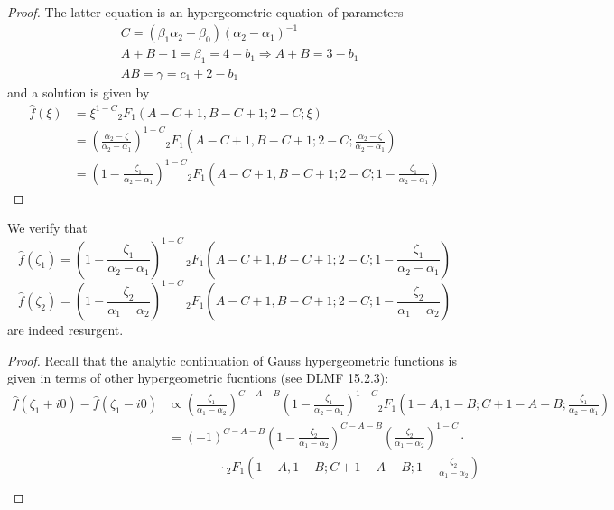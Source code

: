 \documentclass[11pt,a4paper,twoside,leqno,noamsfonts]{amsart}
\numberwithin{equation}{section}
\begin{document}
\begin{proof}
The latter equation is an hypergeometric equation of parameters 
\begin{align*}
&C=(\beta_1\alpha_2+\beta_0)(\alpha_2-\alpha_1)^{-1}\\
&A+B+1=\beta_1=4-b_1 \Rightarrow A+B=3-b_1\\
&AB=\gamma=c_1+2-b_1
\end{align*}
and a solution is given by 
\begin{align*}
\hat{f}(\xi)&=\xi^{1-C} {}_2F_1(A-C+1,B-C+1;2-C;\xi)\\
&=\left(\frac{\alpha_2-\zeta}{\alpha_2-\alpha_1}\right)^{1-C} {}_2F_1\left(A-C+1,B-C+1;2-C;\frac{\alpha_2-\zeta}{\alpha_2-\alpha_1}\right)\\
&=\left(1-\frac{\zeta_1}{\alpha_2-\alpha_1}\right)^{1-C} {}_2F_1\left(A-C+1,B-C+1;2-C;1-\frac{\zeta_1}{\alpha_2-\alpha_1}\right)
\end{align*} 

\end{proof}

\begin{prop}
We verify that 
\begin{equation}
\hat{f}(\zeta_1)=\left(1-\frac{\zeta_1}{\alpha_2-\alpha_1}\right)^{1-C} \, {}_2F_1\left(A-C+1,B-C+1;2-C;1-\frac{\zeta_1}{\alpha_2-\alpha_1} \right)
\end{equation}
\begin{equation}
\hat{f}(\zeta_2)=\left(1-\frac{\zeta_2}{\alpha_1-\alpha_2}\right)^{1-C} \, {}_2F_1\left(A-C+1,B-C+1;2-C;1-\frac{\zeta_2}{\alpha_1-\alpha_2} \right)
\end{equation}
are indeed resurgent.  
\end{prop}

\begin{proof}
\color{Tan}
Recall that the analytic continuation of Gauss hypergeometric functions is given in terms of other hypergeometric fucntions (see DLMF 15.2.3):
\begin{align*}
\hat{f}(\zeta_1+i0)-\hat{f}(\zeta_1-i0)&\propto\left(\frac{\zeta_1}{\alpha_1-\alpha_2}\right)^{C-A-B}\left(1-\frac{\zeta_1}{\alpha_2-\alpha_1}\right)^{1-C} {}_2F_1\left(1-A,1-B;C+1-A-B;\frac{\zeta_1}{\alpha_2-\alpha_1}\right)\\
&=(-1)^{C-A-B}\left(1-\frac{\zeta_2}{\alpha_1-\alpha_2}\right)^{C-A-B}\left(\frac{\zeta_2}{\alpha_1-\alpha_2}\right)^{1-C}\cdot\\
&\qquad\qquad \cdot {}_2F_1\left(1-A,1-B;C+1-A-B;1-\frac{\zeta_2}{\alpha_1-\alpha_2}\right)\\
\end{align*}
\color{black}
\end{proof}
\end{document}
